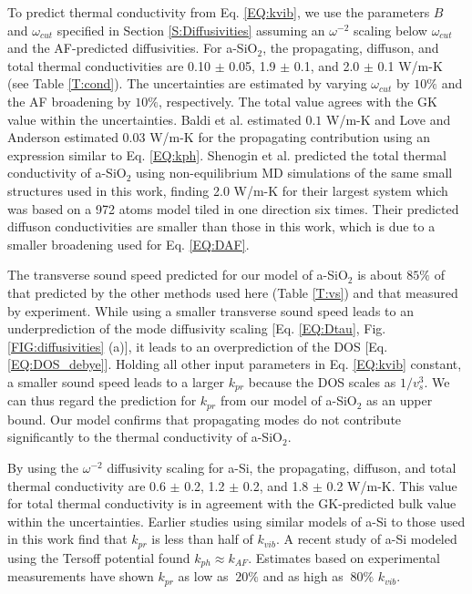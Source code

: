 \documentclass[aps,prb,onecolumn,preprint,superscriptaddress,footinbib,amsmath,amssymb,floatfix]{revtex4}
\begin{document}
To predict thermal conductivity from Eq. \eqref{EQ:kvib}, 
we use the parameters $B$ and $\omega_{cut}$ specified 
in Section \ref{S:Diffusivities} assuming an $\omega^{-2}$ 
scaling below $\omega_{cut}$ and the AF-predicted diffusivities. 
For a-SiO$_2$, the propagating, diffuson, and total thermal 
conductivities are 0.10 $\pm$ 0.05, 1.9 $\pm$ 0.1, 
and 2.0 $\pm$ 0.1 W/m-K (see Table \ref{T:cond}). The uncertainties 
are estimated by varying $\omega_{cut}$ by $10\%$ and the AF 
broadening by $10\%$, respectively.  
The total value agrees with the GK value within the uncertainties. 
Baldi et al. estimated $0.1$ W/m-K 
\cite{baldi_thermal_2008} and Love and Anderson estimated 0.03 
W/m-K\cite{love_estimate_1990} for the propagating contribution 
using an expression similar to Eq. \eqref{EQ:kph}.
Shenogin et al. predicted the total thermal 
conductivity of a-SiO$_2$ using 
non-equilibrium MD simulations of the same small structures 
used in this work, finding 2.0 W/m-K for their 
largest system which was based on a 972 atoms model 
tiled in one direction six times.\cite{shenogin_predicting_2009} 
Their predicted diffuson conductivities are smaller than those  
in this work, which is due to a smaller broadening used for 
Eq. \eqref{EQ:DAF}.  

The transverse sound speed predicted for our model of 
a-SiO$_2$ is about $85\%$ of that predicted by 
the other methods used here (Table \ref{T:vs}) and that 
measured by experiment.
\cite{vacher_ultrasonic_1981,benassi_evidence_1996,
ruocco_high-frequency_2001,polian_elastic_2002,
ruzicka_evidence_2004} 
While using a smaller transverse sound speed 
leads to an underprediction of the 
mode diffusivity scaling [Eq. \eqref{EQ:Dtau},
Fig. \ref{FIG:diffusivities} (a)], it leads to an 
overprediction of the DOS [Eq. \eqref{EQ:DOS_debye}]. 
Holding all other input parameters in Eq. \eqref{EQ:kvib} constant, 
a smaller sound speed leads to a larger $k_{pr}$ 
because the DOS scales as 
$1/v^3_{s}$. We can thus regard 
the prediction for $k_{pr}$ from 
our model of a-SiO$_2$ as an upper bound. 
Our model confirms that propagating modes do not contribute 
significantly to the thermal conductivity of a-SiO$_2$.

By using the $\omega^{-2}$ diffusivity scaling for a-Si, 
the propagating, diffuson, and total thermal conductivity are 
0.6 $\pm$ 0.2, 1.2 $\pm$ 0.2, and 1.8 $\pm$ 0.2 W/m-K. 
This value for total thermal conductivity 
is in agreement with the GK-predicted bulk value within the 
uncertainties. Earlier studies using 
similar models of a-Si to those used in this work find 
that $k_{pr}$ is less than half of 
$k_{vib}$.\cite{feldman_thermal_1993,
feldman_numerical_1999} 
A recent study of a-Si modeled using the Tersoff potential found 
$k_{ph} \approx k_{AF}$.\cite{he_heat_2011} 
Estimates based on experimental measurements 
have shown $k_{pr}$ as low as 
$~20\%$\cite{cahill_thermal_1994,feldman_numerical_1999} 
and as high as $~80\%$ $k_{vib}$.
\cite{liu_high_2009,yang_anomalously_2010}
\end{document}
